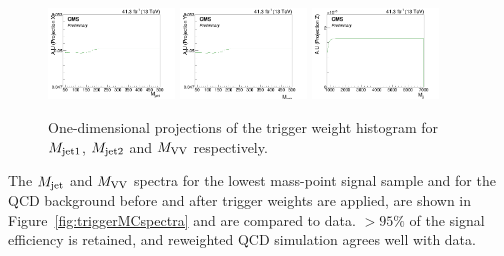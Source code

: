 \begin{figure}[htb]
\centering
\includegraphics[width=0.3\textwidth]{figures/analysis/search3/AN-17-303/trigger/3D_x.png}
\includegraphics[width=0.3\textwidth]{figures/analysis/search3/AN-17-303/trigger/3D_y.png}
\includegraphics[width=0.3\textwidth]{figures/analysis/search3/AN-17-303/trigger/3D_z.png}
\caption{One-dimensional projections of the trigger weight histogram for $M_{\rm jet1}$, $M_{\rm jet2}$ and $M_{\rm VV}$ respectively.}
\label{fig:triggerProj}
\end{figure}
The $M_{\rm jet}$ and $M_{\rm VV}$ spectra for the lowest mass-point signal sample and for the QCD background before and after trigger weights are applied,
are shown in Figure~\ref{fig:triggerMCspectra} and are compared to data. $>95\%$ of the signal efficiency is retained, and reweighted QCD simulation agrees well with data.
